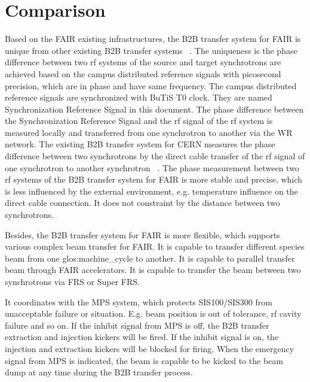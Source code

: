 \section{Comparison}

Based on the FAIR existing infrastructures, the B2B transfer system for FAIR is unique from other existing B2B transfer systems ~\cite{ferrand_synchronization_2015}. The uniqueness is the phase difference between two rf systems of the source and target synchrotrons are achieved based on the campus distributed reference signals with picosecond precision, which are in phase and have same frequency. The campus distributed reference signals are synchronized with BuTiS T0 clock. They are named Synchronization Reference Signal in this document. The phase difference between the Synchronization Reference Signal and the rf signal of the rf system is measured locally and transferred from one synchrotron to another via the WR network. The existing B2B transfer system for CERN measures the phase difference between two synchrotrons by the direct cable transfer of the rf signal of one synchrotron to another synchrotron ~\cite{ferrand_synchronization_2015}. The phase measurement between two rf systems of the B2B transfer system for FAIR is more stable and precise, which is less influenced by the external environment, e.g. temperature influence on the direct cable connection. It does not constraint by the distance between two synchrotrons.

Besides, the B2B transfer system for FAIR is more flexible, which supports various complex beam transfer for FAIR.  It is capable to transfer different species beam from one \gls{glos:machine_cycle} to another.  It is capable to parallel transfer beam through FAIR accelerators. It is capable to transfer the beam between two synchrotrons via FRS or Super FRS. 

It coordinates with the MPS system, which protects SIS100/SIS300 from unacceptable failure or situation. E.g. beam position is out of tolerance, rf cavity failure and so on. If the inhibit signal from MPS is off, the B2B transfer extraction and injection kickers will be fired. If the inhibit signal is on, the injection and extraction kickers will be blocked for firing.  When the emergency signal from MPS is indicated, the beam is capable to be kicked to the beam dump at any time during the B2B transfer process.


